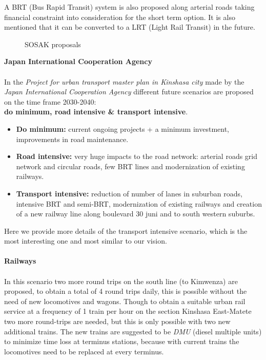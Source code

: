 \documentclass{article}
\begin{document}
A BRT (Bus Rapid Transit) system is also proposed along arterial roads taking financial constraint into consideration for the short term option. It is also mentioned that it can be converted to a LRT (Light Rail Transit) in the future.
\begin{figure}[H]
{\centering
{}
\qquad
{}
\caption{SOSAK proposals}\par}
\end{figure}
\noindent \textbf{Japan International Cooperation Agency}\\
\\
In the \textit{Project for urban transport master plan in Kinshasa city} made by the \textit{Japan International Cooperation Agency} different future scenarios are proposed on the time frame 2030-2040: \\ \textbf{do minimum, road intensive \& transport intensive}.
\begin{itemize}
\item{\textbf{Do minimum:} current ongoing projects + a minimum investment, improvements in road maintenance.}
\item{\textbf{Road intensive:} very huge impacts to the road network: arterial roads grid network and circular roads, few BRT lines and modernization of existing railways.}
\item{\textbf{Transport intensive:} reduction of number of lanes in suburban roads, intensive BRT and semi-BRT, 
modernization of existing railways and creation of a new railway line along boulevard 30 juni and to south western suburbs.}
\end{itemize}
Here we provide more details of the transport intensive scenario, which is the most interesting one and most similar to our vision.\\
\\
\textbf{Railways}\\
\\
In this scenario two more round trips on the south line (to Kimwenza) are proposed, to obtain a total of 4 round trips daily, this is possible without the need of new locomotives and wagons. Though to obtain a suitable urban rail service at a frequency of 1 train per hour on the section Kinshasa East-Matete two more round-trips are needed, but this is only possible with two new additional trains. The new trains are suggested to be \textit{DMU} (diesel multiple units) to minimize time loss at terminus stations, because with current trains the locomotives need to be replaced at every terminus. \\
\end{document}
